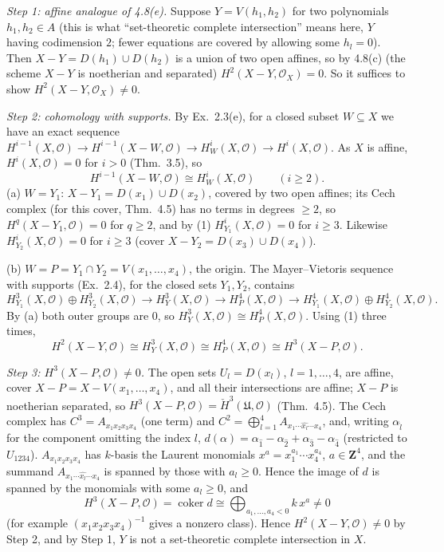 \documentclass[11pt]{article}
\begin{document}
\emph{Step 1: affine analogue of 4.8(e).} Suppose $Y=V(h_1,h_2)$ for two polynomials $h_1,h_2\in A$ (this is what ``set-theoretic complete intersection'' means here, $Y$ having codimension $2$; fewer equations are covered by allowing some $h_l=0$). Then $X-Y=D(h_1)\cup D(h_2)$ is a union of two open affines, so by 4.8(c) (the scheme $X-Y$ is noetherian and separated) $H^2(X-Y,\mathcal O_X)=0$. So it suffices to show $H^2(X-Y,\mathcal O_X)\ne0$.

\emph{Step 2: cohomology with supports.} By Ex.~2.3(e), for a closed subset $W\subseteq X$ we have an exact sequence $H^{i-1}(X,\mathcal O)\to H^{i-1}(X-W,\mathcal O)\to H^i_W(X,\mathcal O)\to H^i(X,\mathcal O)$. As $X$ is affine, $H^i(X,\mathcal O)=0$ for $i>0$ (Thm.~3.5), so
\[
H^{i-1}(X-W,\mathcal O)\cong H^i_W(X,\mathcal O)\qquad(i\ge2).\tag{1}
\]
(a) $W=Y_1$: $X-Y_1=D(x_1)\cup D(x_2)$, covered by two open affines; its Cech complex (for this cover, Thm.~4.5) has no terms in degrees $\ge2$, so $H^q(X-Y_1,\mathcal O)=0$ for $q\ge2$, and by (1) $H^i_{Y_1}(X,\mathcal O)=0$ for $i\ge3$. Likewise $H^i_{Y_2}(X,\mathcal O)=0$ for $i\ge3$ (cover $X-Y_2=D(x_3)\cup D(x_4)$).

(b) $W=P=Y_1\cap Y_2=V(x_1,\dots,x_4)$, the origin. The Mayer--Vietoris sequence with supports (Ex.~2.4), for the closed sets $Y_1,Y_2$, contains
\[
H^3_{Y_1}(X,\mathcal O)\oplus H^3_{Y_2}(X,\mathcal O)\to H^3_Y(X,\mathcal O)\to H^4_P(X,\mathcal O)\to H^4_{Y_1}(X,\mathcal O)\oplus H^4_{Y_2}(X,\mathcal O).
\]
By (a) both outer groups are $0$, so $H^3_Y(X,\mathcal O)\cong H^4_P(X,\mathcal O)$. Using (1) three times,
\[
H^2(X-Y,\mathcal O)\cong H^3_Y(X,\mathcal O)\cong H^4_P(X,\mathcal O)\cong H^3(X-P,\mathcal O).
\]

\emph{Step 3: $H^3(X-P,\mathcal O)\ne0$.} The open sets $U_l=D(x_l)$, $l=1,\dots,4$, are affine, cover $X-P=X-V(x_1,\dots,x_4)$, and all their intersections are affine; $X-P$ is noetherian separated, so $H^3(X-P,\mathcal O)=\check H^3(\mathfrak U,\mathcal O)$ (Thm.~4.5). The Cech complex has $C^3=A_{x_1x_2x_3x_4}$ (one term) and $C^2=\bigoplus_{l=1}^4A_{x_1\cdots\widehat{x_l}\cdots x_4}$, and, writing $\alpha_{\hat l}$ for the component omitting the index $l$, $d(\alpha)=\alpha_{\hat1}-\alpha_{\hat2}+\alpha_{\hat3}-\alpha_{\hat4}$ (restricted to $U_{1234}$). $A_{x_1x_2x_3x_4}$ has $k$-basis the Laurent monomials $x^a=x_1^{a_1}\cdots x_4^{a_4}$, $a\in\mathbf Z^4$, and the summand $A_{x_1\cdots\widehat{x_l}\cdots x_4}$ is spanned by those with $a_l\ge0$. Hence the image of $d$ is spanned by the monomials with some $a_l\ge0$, and
\[
H^3(X-P,\mathcal O)=\operatorname{coker}d\cong\bigoplus_{a_1,\dots,a_4<0}k\,x^a\ne0
\]
(for example $(x_1x_2x_3x_4)^{-1}$ gives a nonzero class). Hence $H^2(X-Y,\mathcal O)\neq0$ by Step 2, and by Step 1, $Y$ is not a set-theoretic complete intersection in $X$.
\end{document}
